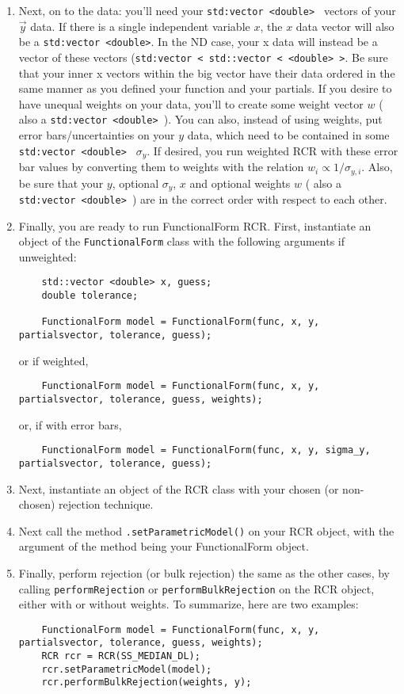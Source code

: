 \documentclass[12pt]{article}
\begin{document}
\begin{enumerate}
	\item Next, on to the data: you'll need your \texttt{std:vector <double> } vectors of your $\vec{y}$ data. If there is a single independent variable $x$, the $x$ data vector will also be a \texttt{std:vector <double>}. In the ND case, your x data will instead be a vector of these vectors (\texttt{std:vector < std::vector < <double> >}. Be sure that your inner x vectors within the big vector have their data ordered in the same manner as you defined your function and your partials. If you desire to have unequal weights on your data, you'll to create some weight vector $w$ ( also a \texttt{std:vector <double> }). You can also, instead of using weights, put error bars/uncertainties on your $y$ data, which need to be contained in some           \texttt{std:vector <double> } $\sigma_y$. If desired, you run weighted RCR with these error bar values by converting them to weights with the relation $w_i \propto 1/\sigma_{y, i}$. Also, be sure that your $y$, optional $\sigma_y$, $x$ and optional weights $w$ ( also a \texttt{std:vector <double> }) are in the correct order with respect to each other.
	\item Finally, you are ready to run FunctionalForm RCR. First, instantiate an object of the \texttt{FunctionalForm} class with the following arguments if unweighted:
	\begin{lstlisting}
	std::vector <double> x, guess;
	double tolerance;
	
	FunctionalForm model = FunctionalForm(func, x, y, partialsvector, tolerance, guess);
	\end{lstlisting}
	or if weighted,
	\begin{lstlisting}
	FunctionalForm model = FunctionalForm(func, x, y, partialsvector, tolerance, guess, weights);
	\end{lstlisting}
	or, if with error bars,
	\begin{lstlisting}
	FunctionalForm model = FunctionalForm(func, x, y, sigma_y, partialsvector, tolerance, guess);
	\end{lstlisting}
	\item Next, instantiate an object of the RCR class with your chosen (or non-chosen) rejection technique.
	\item Next call the method \texttt{.setParametricModel()} on your RCR object, with the argument of the method being your FunctionalForm object.
	\item Finally, perform rejection (or bulk rejection) the same as the other cases, by calling \texttt{performRejection} or \texttt{performBulkRejection} on the RCR object, either with or without weights. To summarize, here are two examples:
	\begin{lstlisting}
	FunctionalForm model = FunctionalForm(func, x, y, partialsvector, tolerance, guess, weights);
	RCR rcr = RCR(SS_MEDIAN_DL);
	rcr.setParametricModel(model);
	rcr.performBulkRejection(weights, y);
	

\end{lstlisting}
\end{enumerate}
\end{document}
